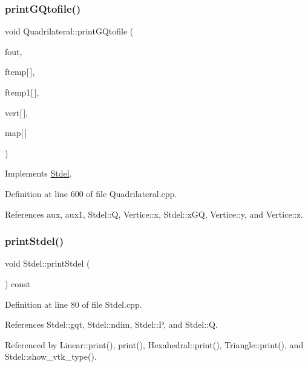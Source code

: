\subsubsection{\texorpdfstring{print\+G\+Qtofile()}{printGQtofile()}}
{\footnotesize\ttfamily void Quadrilateral\+::print\+G\+Qtofile (\begin{DoxyParamCaption}\item[{F\+I\+LE $\ast$}]{fout,  }\item[{const double}]{ftemp\mbox{[}$\,$\mbox{]},  }\item[{const double}]{ftemp1\mbox{[}$\,$\mbox{]},  }\item[{const \hyperlink{structVertice}{Vertice}}]{vert\mbox{[}$\,$\mbox{]},  }\item[{const int}]{map\mbox{[}$\,$\mbox{]} }\end{DoxyParamCaption})\hspace{0.3cm}{\ttfamily [virtual]}}



Implements \hyperlink{classStdel_a8196ddf2ec3c88627e33d19f93fdb354}{Stdel}.



Definition at line 600 of file Quadrilateral.\+cpp.



References aux, aux1, Stdel\+::Q, Vertice\+::x, Stdel\+::x\+GQ, Vertice\+::y, and Vertice\+::z.

\mbox{\label{classStdel_a54b5768d09f500cb949e66fc234eac70}} 
\subsubsection{\texorpdfstring{print\+Stdel()}{printStdel()}}
{\footnotesize\ttfamily void Stdel\+::print\+Stdel (\begin{DoxyParamCaption}{ }\end{DoxyParamCaption}) const\hspace{0.3cm}{\ttfamily [inherited]}}



Definition at line 80 of file Stdel.\+cpp.



References Stdel\+::gqt, Stdel\+::ndim, Stdel\+::P, and Stdel\+::Q.



Referenced by Linear\+::print(), print(), Hexahedral\+::print(), Triangle\+::print(), and Stdel\+::show\+\_\+vtk\+\_\+type().

